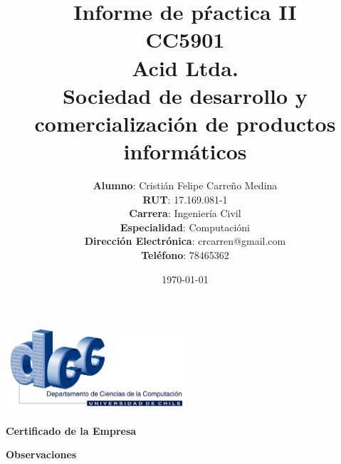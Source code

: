 \documentclass[11pt,titlepage]{article} %
\title{
	\vspace{2cm}
	\textbf{
		\huge{
			Informe de pŕactica II\\
			CC5901\\}
	}
	\vspace{0.5cm}
	Acid Ltda.\\
	\large{
		Sociedad de desarrollo y comercialización de productos informáticos}
	\vspace{4cm}
}
\author{
	\textbf{Alumno}: {\hfill Cristián Felipe Carreño Medina}\\
	\textbf{RUT}: {\hfill 17.169.081-1}\\
	\textbf{Carrera}: \hfill Ingeniería Civil\\
	\textbf{Especialidad}: \hfill Computacióni\\
	\textbf{Dirección Electrónica}: \hfill crcarren@gmail.com\\
	\textbf{Teléfono}: \hfill 78465362\\
}
\date{\today
	 \vspace{1.0cm}} %
\begin{document}
\begin{minipage}{15cm}
	\includegraphics[width=0.5\textwidth]{dcc.png}
	\maketitle
\end{minipage}

\textbf{
		\huge{Certificado de la Empresa}
	}
\clearpage

\textbf{
		\huge{Observaciones}
	}
\clearpage

\tableofcontents

\renewcommand{\baselinestretch}{2}  %




 
 
 
\end{document}
